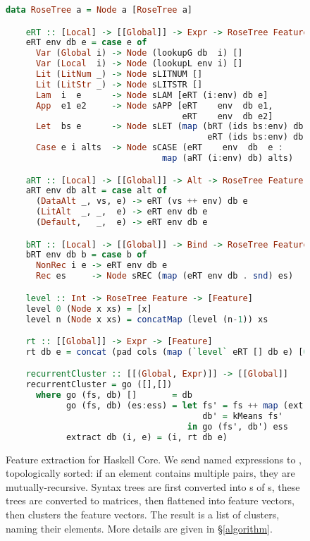 \begin{figure}
  \begin{lstlisting}[language=Haskell, xleftmargin=.1\textwidth, xrightmargin=.1\textwidth]
    data RoseTree a = Node a [RoseTree a]

    eRT :: [Local] -> [[Global]] -> Expr -> RoseTree Feature
    eRT env db e = case e of
      Var (Global i) -> Node (lookupG db  i) []
      Var (Local  i) -> Node (lookupL env i) []
      Lit (LitNum _) -> Node sLITNUM []
      Lit (LitStr _) -> Node sLITSTR []
      Lam  i  e      -> Node sLAM [eRT (i:env) db e]
      App  e1 e2     -> Node sAPP [eRT    env  db e1,
                                   eRT    env  db e2]
      Let  bs e      -> Node sLET (map (bRT (ids bs:env) db) bs ++
                                        eRT (ids bs:env) db  e
      Case e i alts  -> Node sCASE (eRT    env  db  e :
                               map (aRT (i:env) db) alts)

    aRT :: [Local] -> [[Global]] -> Alt -> RoseTree Feature
    aRT env db alt = case alt of
      (DataAlt _, vs, e) -> eRT (vs ++ env) db e
      (LitAlt  _, _,  e) -> eRT env db e
      (Default,   _,  e) -> eRT env db e

    bRT :: [Local] -> [[Global]] -> Bind -> RoseTree Feature
    bRT env db b = case b of
      NonRec i e -> eRT env db e
      Rec es     -> Node sREC (map (eRT env db . snd) es)

    level :: Int -> RoseTree Feature -> [Feature]
    level 0 (Node x xs) = [x]
    level n (Node x xs) = concatMap (level (n-1)) xs

    rt :: [[Global]] -> Expr -> [Feature]
    rt db e = concat (pad cols (map (`level` eRT [] db e) [0..rows]))

    recurrentCluster :: [[(Global, Expr)]] -> [[Global]]
    recurrentCluster = go ([],[])
      where go (fs, db) []       = db
            go (fs, db) (es:ess) = let fs' = fs ++ map (extract db) es
                                       db' = kMeans fs'
                                    in go (fs', db') ess
            extract db (i, e) = (i, rt db e)
  \end{lstlisting}
  \caption{Feature extraction for Haskell Core. We send named expressions to , topologically sorted: if an element contains multiple  pairs, they are mutually-recursive. Syntax trees are first converted into s of s, these trees are converted to matrices, then flattened into feature vectors, then  clusters the feature vectors. The result is a list of clusters, naming their elements. More details are given in \S \ref{algorithm}.}
  \label{featureextractionalgorithm}
\end{figure}

